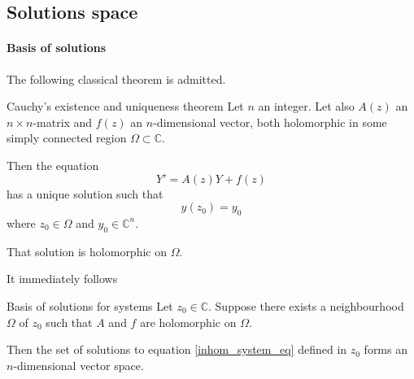 \documentclass[../main.tex]{subfiles}
\begin{document}
\subsection{Solutions space}

\paragraph{Basis of solutions}

The following classical theorem is admitted.

\begin{thm}{Cauchy's existence and uniqueness theorem}\label{thm_cauchy}
	Let $n$ an integer. Let also $A(z)$ an $n \times n$-matrix and $f(z)$ an $n$-dimensional vector, both holomorphic in some simply connected region $\Omega \subset \mathbb{C}$.
	
	Then the equation
	\begin{equation}\label{inhom_system_eq}
	Y' = A(z) Y + f(z)
	\end{equation}
	has a unique solution such that
	\begin{equation*}
		y(z_0) = y_0
	\end{equation*}
	where $z_0 \in \Omega$ and $y_0 \in \mathbb{C}^n$.
	
	That solution is holomorphic on $\Omega$.
\end{thm}

It immediately follows

\begin{cor}{Basis of solutions for systems}
	Let $z_0 \in \mathbb{C}$. Suppose there exists a neighbourhood $\Omega$ of $z_0$ such that $A$ and $f$ are holomorphic on $\Omega$.
	
	Then the set of solutions to equation \eqref{inhom_system_eq} defined in $z_0$ forms an $n$-dimensional vector space. 
\end{cor}
\end{document}
